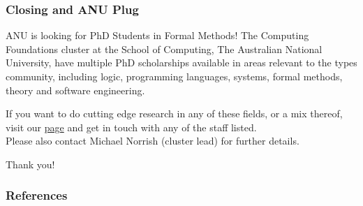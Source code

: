 \documentclass
  [hyperref={colorlinks = true,linkcolor = blue, 
             citecolor = blue, urlcolor = blue}
  ]{beamer}
\begin{document}
\begin{frame}[fragile]
  \frametitle{Closing and ANU Plug}
  \begin{block}{ANU is looking for PhD Students in Formal
  Methods!}
  The Computing Foundations cluster at the School of Computing, The
Australian National University, have multiple PhD scholarships available in
areas relevant to the types community, including logic, programming
languages, systems, formal methods, theory and software engineering.

If you want to do cutting edge research in any of these fields, or a mix
thereof, visit our
\href{https://comp.anu.edu.au/research/clusters/computing-foundations/}{page}
and get in touch with any of the staff listed. \\ 
Please also contact Michael
Norrish (cluster lead) for further details.
  \end{block}
Thank you!
\end{frame}

\begin{frame}[fragile]
\frametitle{References}
{}
\end{frame}
\end{document}
